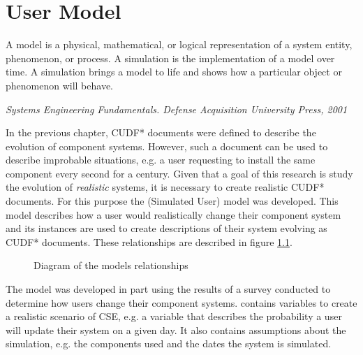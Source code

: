 \chapter{User Model}
\label{simulation}
\epigraph{A model is a physical, mathematical, or logical representation of a system entity, phenomenon, or process. 
A simulation is the implementation of a model over time. 
A simulation brings a model to life and shows how a particular object or phenomenon will behave.}
{\textit{Systems Engineering Fundamentals. Defense Acquisition University Press, 2001}}

In the previous chapter, CUDF* documents were defined to describe the evolution of component systems.
However, such a document can be used to describe improbable situations,
e.g. a user requesting to install the same component every second for a century.
Given that a goal of this research is study the evolution of \textit{realistic} systems,
it is necessary to create realistic CUDF* documents. 
For this purpose the \usermodel (Simulated User) model was developed.
This model describes how a user would realistically change their component system
and its instances are used to create descriptions of their system evolving as CUDF* documents.
These relationships are described in figure \ref{sim.modeldiagram}.

\begin{figure}[htp]
\begin{center}
  \caption{Diagram of the \usermodel models relationships}
  \label{sim.modeldiagram}
\end{center}
\end{figure}

The \usermodel model was developed in part using the results of a survey conducted to determine how users change their component systems.
\usermodel contains variables to create a realistic scenario of CSE, e.g. a variable that describes the probability a user will update their system on a given day.
It also contains assumptions about the simulation, e.g. the components used and the dates the system is simulated.

